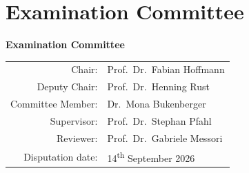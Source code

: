 \chapter*{Examination Committee}
\begin{center}
\vspace*{3cm}

\else
\clearpage
\thispagestyle{empty}
\begin{center}
    \vspace*{3cm}

    {\Large \textbf{Examination Committee}}\\[2cm]
    \fi


    \begin{tabular}{rl}
        Chair:            & Prof.\ Dr.\ Fabian Hoffmann           \\
        Deputy Chair:     & Prof.\ Dr.\ Henning Rust              \\
        Committee Member: & Dr.\ Mona Bukenberger                 \\[1em]
        Supervisor:       & Prof.\ Dr.\ Stephan Pfahl             \\
        Reviewer:         & Prof.\ Dr.\ Gabriele Messori          \\[1em]
        Disputation date: & 14\textsuperscript{th} September 2026 \\
    \end{tabular}
\end{center}
\cleardoublepage
\ifreviewersinbinding\else
    \clearpage
\fi


\end{center}

